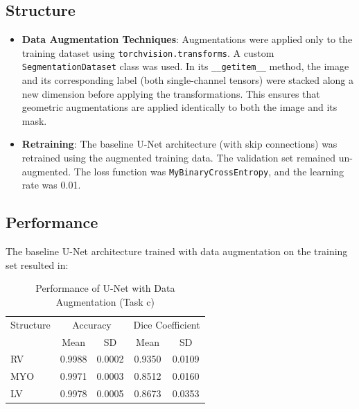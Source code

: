 \documentclass{article}
\begin{document}
\subsection{Structure}
\begin{itemize}
  \item \textbf{Data Augmentation Techniques}: Augmentations were applied only to the training dataset using 
  \texttt{torchvision.transforms}. A custom \texttt{SegmentationDataset} class was used. In its \texttt{\_\_getitem\_\_} method, 
  the image and its corresponding label (both single-channel tensors) were stacked along a new dimension before applying the 
  transformations. This ensures that geometric augmentations are applied identically to both the image and its mask.
  \item \textbf{Retraining}: The baseline U-Net architecture (with skip connections) was retrained using the augmented training data. 
  The validation set remained un-augmented. The loss function was \texttt{MyBinaryCrossEntropy}, and the learning rate was 0.01.
\end{itemize}

\subsection{Performance}
The baseline U-Net architecture trained with data augmentation on the training set resulted in:
\begin{table}[H]
\centering
\caption{Performance of U-Net with Data Augmentation (Task c)}
\label{tab:data_aug_unet}
\begin{tabular}{l|cc|cc}
\toprule
\multicolumn{1}{c|}{Structure} & \multicolumn{2}{c|}{Accuracy} & \multicolumn{2}{c}{Dice Coefficient} \\
          & Mean      & SD        & Mean          & SD          \\
\midrule
RV        & 0.9988    & 0.0002    & 0.9350        & 0.0109      \\
MYO       & 0.9971    & 0.0003    & 0.8512        & 0.0160      \\
LV        & 0.9978    & 0.0005    & 0.8673        & 0.0353      \\
\bottomrule
\end{tabular}
\end{table}
\end{document}
